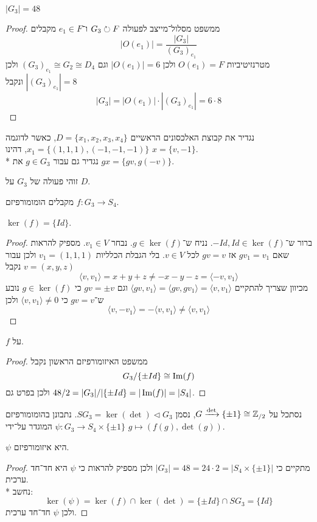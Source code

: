 \begin{conclusion}
	$|G_3| = 48$
\end{conclusion}
\begin{proof}
	ממשפט מסלול־מייצב לפעולה $G_3 \circlearrowright F$ ו־$e_1 \in F$ מקבלים
	\[
		|O(e_1)| = \frac{|G_3|}{{(G_3)}_{e_1}}
	\]
	מטרנזיטיביות $O(e_1) = F$ ולכן $|O(e_1)| = 6$ וגם ${(G_3)}_{e_1} \cong G_2 \cong D_4$ ולכן $|{(G_3)}_{e_1}| = 8$ ונקבל
	\[
		|G_3| = |O(e_1)| \cdot |{(G_3)}_{e_1}| = 6 \cdot 8
	\]
\end{proof}
נגדיר את קבוצת האלכסונים הראשיים $D = \{x_1, x_2, x_3, x_4\}$, כאשר לדוגמה $x_1 = \{ (1, 1, 1), (-1, -1, -1) \}$, דהינו $x = \{v, -1\}$. \\*
נגדיר גם עבור $g \in G_3$ את $gx = \{ gv, g(-v)\}$.
\begin{proposition}
	זוהי פעולה של $G_3$ על $D$.
\end{proposition}
מקבלים הומומורפיזם $f : G_3 \to S_4$.
\begin{lemma}
	$\ker(f) = \{ Id \}$.
\end{lemma}
\begin{proof}
	ברור ש־$-Id, Id \in \ker(f)$.
	נניח ש־$g \in \ker(f)$.
	נבחר $v_1 \in V$.
	מספיק להראות שאם $g v_1 = v_1$ אז $gv = v$ לכל $v \in V$.
	בלי הגבלת הכלליות $v_1 = (1, 1, 1)$ ולכן עבור $v = (x, y, z)$ נקבל
	\[
		\langle v, v_1 \rangle = x + y + z \ne -x - y - z = \langle -v, v_1 \rangle
	\]
	מכיוון שצריך להתקיים $\langle gv, v_1 \rangle = \langle gv, gv_1 \rangle = \langle v, v_1 \rangle$
	וגם $gv = \pm v$ כי $g \in \ker(f)$ נובע ש־$gv = v$ כי $\langle v, v_1 \rangle \ne 0$ ולכן
	\[
		\langle v, -v_1 \rangle = - \langle v, v_1 \rangle \ne \langle v, v_1 \rangle
	\]
\end{proof}
\begin{conclusion}
	$f$ על.
\end{conclusion}
\begin{proof}
	ממשפט האיזומורפיזם הראשון נקבל
	\[
		G_3 / \{\pm Id\} \cong \operatorname{Im}(f)
	\]
	ולכן בפרט גם $48 / 2 = |G_3| / |\{ \pm Id \} = |\operatorname{Im}(f)| = |S_4|$.
\end{proof}
נסתכל על $G \xrightarrow{\det} \{ \pm 1 \} \cong \mathbb{Z}_{/2}$, נסמן $SG_3 = \ker(\det) \triangleleft G_3$.
נתבונן בהומומורפיזם $\psi : G_3 \to S_4 \times \{\pm 1\}$ המוגדר על־ידי $g \mapsto (f(g), \det(g))$.
\begin{proposition}
	$\psi$ היא איזומורפיזם.
\end{proposition}
\begin{proof}
	מתקיים כי $|G_3| = 48 = 24 \cdot 2 = |S_4 \times \{\pm 1\}|$ ולכן מספיק להראות כי $\psi$ היא חד־חד ערכית. \\*
	נחשב:
	\[
		\ker(\psi) = \ker(f) \cap \ker(\det) = \{ \pm Id \} \cap SG_3 = \{ Id \}
	\]
	ולכן $\psi$ חד־חד ערכית.
\end{proof}

